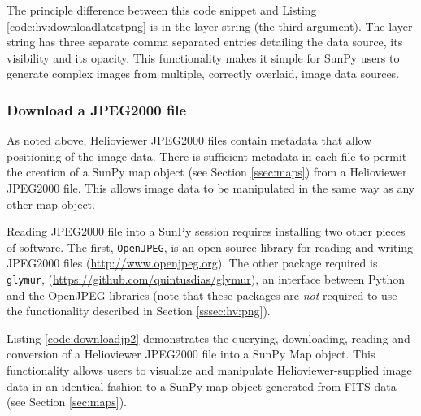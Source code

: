The principle difference between this code snippet and Listing
\ref{code:hv:downloadlatestpng} is in the layer string (the third
argument).  The layer string has three separate comma separated
entries detailing the data source, its visibility and its opacity.
This functionality makes it simple for SunPy users to generate complex
images from multiple, correctly overlaid, image data sources.

\subsubsection{Download a JPEG2000 file}\label{sssec:hv:jp}

As noted above, Helioviewer JPEG2000 files contain metadata that allow
positioning of the image data.  There is sufficient metadata in each
file to permit the creation of a SunPy map object (see Section
\ref{ssec:maps}) from a Helioviewer JPEG2000 file.  This allows image
data to be manipulated in the same way as any other map object.

Reading JPEG2000 file into a SunPy session requires installing two
other pieces of software. The first, \texttt{OpenJPEG}, is an open
source library for reading and writing JPEG2000 files
(\url{http://www.openjpeg.org}).  The other package required is
\texttt{glymur}, (\url{https://github.com/quintusdias/glymur}), an
interface between Python and the OpenJPEG libraries (note that these
packages are {\it not} required to use the functionality described in
Section \ref{sssec:hv:png}).

Listing \ref{code:downloadjp2} demonstrates the querying, downloading,
reading and conversion of a Helioviewer JPEG2000 file into a SunPy Map
object.  This functionality allows users to visualize and manipulate
Helioviewer-supplied image data in an identical fashion to a SunPy map
object generated from FITS data (see Section \ref{sec:maps}).

